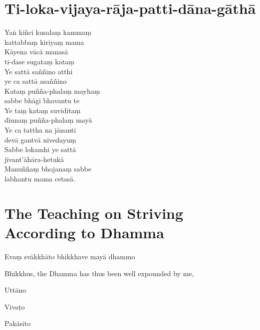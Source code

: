 
\section{Ti-loka-vijaya-rāja-patti-dāna-gāthā}


Yaṅ kiñci kusalaṃ kammaṃ\\
\vin kattabbaṃ kiriyaṃ mama\\
Kāyena vācā manasā\\
\vin ti-dase sugataṃ kataṃ\\
Ye sattā saññino atthi\\
\vin ye ca sattā asaññino\\
Kataṃ puñña-phalaṃ mayhaṃ\\
\vin sabbe bhāgī bhavantu te\\
Ye taṃ kataṃ suviditaṃ\\
\vin dinnaṃ puñña-phalaṃ mayā\\
Ye ca tattha na jānanti\\
\vin devā gantvā nivedayuṃ\\
Sabbe lokamhi ye sattā\\
\vin jīvant'āhāra-hetukā\\
Manuññaṃ bhojanaṃ sabbe\\
\vin labhantu mama cetasā. 

\section[Striving According to Dhamma]{The Teaching on Striving According to Dhamma}


\begin{leader}
\end{leader}

Evaṃ svākkhāto bhikkhave mayā dhammo

\begin{english}
  Bhikkhus, the Dhamma has thus been well expounded by me,
\end{english}

Uttāno


Vivaṭo


Pakāsito

